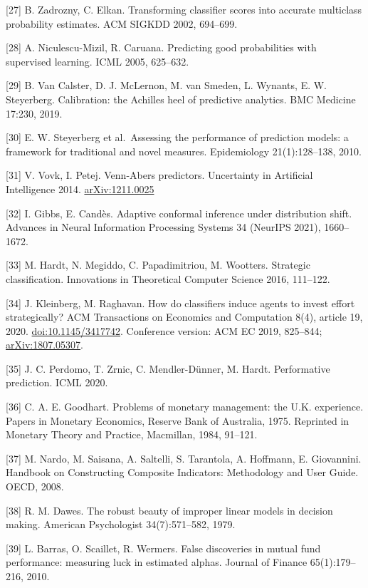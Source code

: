 {[}27{]} B. Zadrozny, C. Elkan. Transforming classifier scores into accurate multiclass probability estimates. ACM SIGKDD 2002, 694--699.

{[}28{]} A. Niculescu-Mizil, R. Caruana. Predicting good probabilities with supervised learning. ICML 2005, 625--632.

{[}29{]} B. Van Calster, D. J. McLernon, M. van Smeden, L. Wynants, E. W. Steyerberg. Calibration: the Achilles heel of predictive analytics. BMC Medicine 17:230, 2019.

{[}30{]} E. W. Steyerberg et al.~Assessing the performance of prediction models: a framework for traditional and novel measures. Epidemiology 21(1):128--138, 2010.

{[}31{]} V. Vovk, I. Petej. Venn-Abers predictors. Uncertainty in Artificial Intelligence 2014. \href{https://arxiv.org/abs/1211.0025}{arXiv:1211.0025}

{[}32{]} I. Gibbs, E. Candès. Adaptive conformal inference under distribution shift. Advances in Neural Information Processing Systems 34 (NeurIPS 2021), 1660--1672.

{[}33{]} M. Hardt, N. Megiddo, C. Papadimitriou, M. Wootters. Strategic classification. Innovations in Theoretical Computer Science 2016, 111--122.

{[}34{]} J. Kleinberg, M. Raghavan. How do classifiers induce agents to invest effort strategically? ACM Transactions on Economics and Computation 8(4), article 19, 2020. \href{https://doi.org/10.1145/3417742}{doi:10.1145/3417742}. Conference version: ACM EC 2019, 825--844; \href{https://arxiv.org/abs/1807.05307}{arXiv:1807.05307}.

{[}35{]} J. C. Perdomo, T. Zrnic, C. Mendler-Dünner, M. Hardt. Performative prediction. ICML 2020.

{[}36{]} C. A. E. Goodhart. Problems of monetary management: the U.K. experience. Papers in Monetary Economics, Reserve Bank of Australia, 1975. Reprinted in Monetary Theory and Practice, Macmillan, 1984, 91--121.

{[}37{]} M. Nardo, M. Saisana, A. Saltelli, S. Tarantola, A. Hoffmann, E. Giovannini. Handbook on Constructing Composite Indicators: Methodology and User Guide. OECD, 2008.

{[}38{]} R. M. Dawes. The robust beauty of improper linear models in decision making. American Psychologist 34(7):571--582, 1979.

{[}39{]} L. Barras, O. Scaillet, R. Wermers. False discoveries in mutual fund performance: measuring luck in estimated alphas. Journal of Finance 65(1):179--216, 2010.

